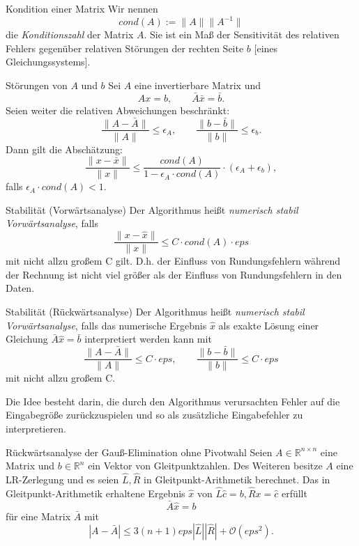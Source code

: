 \begin{flashcard}[Definition]{Kondition einer Matrix}
	Wir nennen
	$$ cond(A) := \| A \| \|A^{-1}\| $$
	die \emph{Konditionszahl} der Matrix $A$.
	Sie ist ein Maß der Sensitivität des relativen Fehlers gegenüber relativen Störungen der rechten Seite $b$ [eines Gleichungssystems].
\end{flashcard}

\begin{flashcard}[Satz]{Störungen von $A$ und $b$}
	Sei $A$ eine invertierbare Matrix und
	$$ Ax = b, \qquad \bar{A}\bar{x}=\bar{b}.$$
	Seien weiter die relativen Abweichungen beschränkt:
	$$ \frac{\|A - \bar{A}\|}{\|A\|} \leq \epsilon_A, \qquad \frac{\|b - \bar{b}\|}{\|b\|} \leq \epsilon_b.$$
	Dann gilt die Abschätzung:
	$$ \frac{\|x - \bar{x}\|}{\|x\|} \leq \frac{cond(A)}{1 - \epsilon_A \cdot cond(A)} \cdot (\epsilon_A + \epsilon_b),$$
	falls $\epsilon_A \cdot cond(A) < 1$.
\end{flashcard}

\begin{flashcard}[Definition]{Stabilität (Vorwärtsanalyse)}
	Der Algorithmus heißt \emph{numerisch stabil Vorwärtsanalyse}, falls
	$$ \frac{\|x - \hat{x}\|}{\|x\|} \leq C \cdot cond(A) \cdot eps$$
	mit nicht allzu großem C gilt.
	D.h. der Einfluss von Rundungsfehlern während der Rechnung ist nicht viel größer als der Einfluss von Rundungsfehlern in den Daten.
\end{flashcard}

\begin{flashcard}[Definition]{Stabilität (Rückwärtsanalyse)}
	Der Algorithmus heißt \emph{numerisch stabil Vorwärtsanalyse}, falls das numerische Ergebnis $\hat{x}$ als exakte Lösung einer Gleichung $\bar{A}\hat{x} = \bar{b}$ interpretiert werden kann mit
	$$ \frac{\|A - \bar{A}\|}{\|A\|} \leq C \cdot eps, \qquad \frac{\|b - \bar{b}\|}{\|b\|} \leq C \cdot eps$$
	mit nicht allzu großem C.

	Die Idee besteht darin, die durch den Algorithmus verursachten Fehler auf die Eingabegröße zurückzuspielen und so als zusätzliche Eingabefehler zu interpretieren.
\end{flashcard}

\begin{flashcard}[Satz]{Rückwärtsanalyse der Gauß-Elimination ohne Pivotwahl}
	Seien $A \in \mathbb{R}^{n \times n}$ eine Matrix und $b \in \mathbb{R}^n$ ein Vektor von Gleitpunktzahlen.
	Des Weiteren besitze $A$ eine LR-Zerlegung und es seien $\hat{L}, \hat{R}$ in Gleitpunkt-Arithmetik berechnet.
	Das in Gleitpunkt-Arithmetik erhaltene Ergebnis $\hat{x}$ von $\hat{L}\hat{c} = b, \hat{R}x = \hat{c}$ erfüllt
	$$ \bar{A}\hat{x} = b $$
	für eine Matrix $\bar{A}$ mit
	$$ |A - \bar{A}| \leq 3 (n + 1) eps |\hat{L}| |\hat{R}| + \mathcal{O}(eps^2).$$
\end{flashcard}


